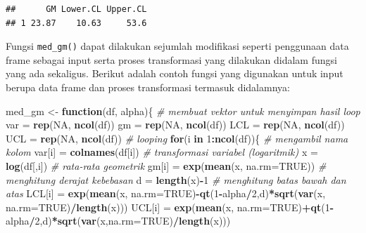 \documentclass[]{book}
\newenvironment{Shaded}{\begin{snugshade}}{\end{snugshade}}
\newcommand{\KeywordTok}[1]{\textcolor[rgb]{0.13,0.29,0.53}{\textbf{#1}}}
\newcommand{\DataTypeTok}[1]{\textcolor[rgb]{0.13,0.29,0.53}{#1}}
\newcommand{\DecValTok}[1]{\textcolor[rgb]{0.00,0.00,0.81}{#1}}
\newcommand{\StringTok}[1]{\textcolor[rgb]{0.31,0.60,0.02}{#1}}
\newcommand{\CommentTok}[1]{\textcolor[rgb]{0.56,0.35,0.01}{\textit{#1}}}
\newcommand{\OtherTok}[1]{\textcolor[rgb]{0.56,0.35,0.01}{#1}}
\newcommand{\ControlFlowTok}[1]{\textcolor[rgb]{0.13,0.29,0.53}{\textbf{#1}}}
\newcommand{\OperatorTok}[1]{\textcolor[rgb]{0.81,0.36,0.00}{\textbf{#1}}}
\newcommand{\NormalTok}[1]{#1}
\begin{document}
\begin{verbatim}
##      GM Lower.CL Upper.CL
## 1 23.87    10.63     53.6
\end{verbatim}

Fungsi \texttt{med\_gm()} dapat dilakukan sejumlah modifikasi seperti
penggunaan data frame sebagai input serta proses transformasi yang
dilakukan didalam fungsi yang ada sekaligus. Berikut adalah contoh
fungsi yang digunakan untuk input berupa data frame dan proses
transformasi termasuk didalamnya:

\begin{Shaded}
\begin{Highlighting}[]
\NormalTok{med_gm <-}\StringTok{ }\ControlFlowTok{function}\NormalTok{(df, alpha)\{}
  \CommentTok{# membuat vektor untuk menyimpan hasil loop}
\NormalTok{  var =}\StringTok{ }\KeywordTok{rep}\NormalTok{(}\OtherTok{NA}\NormalTok{, }\KeywordTok{ncol}\NormalTok{(df))}
\NormalTok{  gm =}\StringTok{ }\KeywordTok{rep}\NormalTok{(}\OtherTok{NA}\NormalTok{, }\KeywordTok{ncol}\NormalTok{(df))}
\NormalTok{  LCL =}\StringTok{ }\KeywordTok{rep}\NormalTok{(}\OtherTok{NA}\NormalTok{, }\KeywordTok{ncol}\NormalTok{(df))}
\NormalTok{  UCL =}\StringTok{ }\KeywordTok{rep}\NormalTok{(}\OtherTok{NA}\NormalTok{, }\KeywordTok{ncol}\NormalTok{(df))}
  \CommentTok{# looping}
  \ControlFlowTok{for}\NormalTok{(i }\ControlFlowTok{in} \DecValTok{1}\OperatorTok{:}\KeywordTok{ncol}\NormalTok{(df))\{}
    \CommentTok{# mengambil nama kolom}
\NormalTok{    var[i] =}\StringTok{ }\KeywordTok{colnames}\NormalTok{(df[i])}
    \CommentTok{# transformasi variabel (logaritmik)}
\NormalTok{    x =}\StringTok{ }\KeywordTok{log}\NormalTok{(df[,i])}
    \CommentTok{# rata-rata geometrik}
\NormalTok{    gm[i] =}\StringTok{ }\KeywordTok{exp}\NormalTok{(}\KeywordTok{mean}\NormalTok{(x, }\DataTypeTok{na.rm=}\OtherTok{TRUE}\NormalTok{))}
    \CommentTok{# menghitung derajat kebebasan}
\NormalTok{    d =}\StringTok{ }\KeywordTok{length}\NormalTok{(x)}\OperatorTok{-}\DecValTok{1}
    \CommentTok{# menghitung batas bawah dan atas}
\NormalTok{    LCL[i] =}\StringTok{ }\KeywordTok{exp}\NormalTok{(}\KeywordTok{mean}\NormalTok{(x, }\DataTypeTok{na.rm=}\OtherTok{TRUE}\NormalTok{)}\OperatorTok{-}\KeywordTok{qt}\NormalTok{(}\DecValTok{1}\OperatorTok{-}\NormalTok{alpha}\OperatorTok{/}\DecValTok{2}\NormalTok{,d)}\OperatorTok{*}\KeywordTok{sqrt}\NormalTok{(}\KeywordTok{var}\NormalTok{(x, }\DataTypeTok{na.rm=}\OtherTok{TRUE}\NormalTok{)}\OperatorTok{/}\KeywordTok{length}\NormalTok{(x)))}
\NormalTok{    UCL[i] =}\StringTok{ }\KeywordTok{exp}\NormalTok{(}\KeywordTok{mean}\NormalTok{(x, }\DataTypeTok{na.rm=}\OtherTok{TRUE}\NormalTok{)}\OperatorTok{+}\KeywordTok{qt}\NormalTok{(}\DecValTok{1}\OperatorTok{-}\NormalTok{alpha}\OperatorTok{/}\DecValTok{2}\NormalTok{,d)}\OperatorTok{*}\KeywordTok{sqrt}\NormalTok{(}\KeywordTok{var}\NormalTok{(x,}\DataTypeTok{na.rm=}\OtherTok{TRUE}\NormalTok{)}\OperatorTok{/}\KeywordTok{length}\NormalTok{(x)))}

\end{Highlighting}
\end{Shaded}
\end{document}

